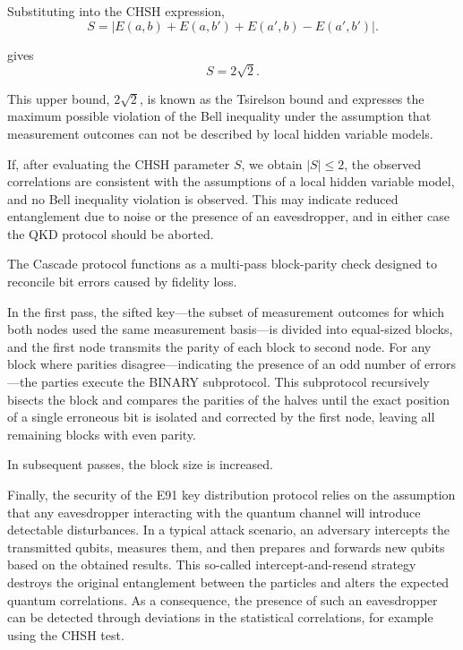 \noindent Substituting into the CHSH expression,
\[
S = \left|E(a, b) + E(a, b') + E(a', b) - E(a', b')\right|.
\]

gives
\[
S =  2\sqrt{2}.
\]

This upper bound, $2\sqrt{2}$, is known as the Tsirelson bound and expresses the maximum possible violation of the Bell inequality under the assumption that measurement outcomes can not be described by local hidden variable models.

If, after evaluating the CHSH parameter $S$, we obtain $|S| \leq 2$, the observed correlations are consistent with the assumptions of a local hidden variable model, and no Bell inequality violation is observed. This may indicate reduced entanglement due to noise or the presence of an eavesdropper, and in either case the QKD protocol should be aborted.

The Cascade protocol functions as a multi-pass block-parity check designed to reconcile bit errors caused by fidelity loss.

In the first pass, the sifted key—the subset of measurement outcomes for which both nodes used the same measurement basis—is divided into equal-sized blocks, and the first node transmits the parity of each block to second node. For any block where parities disagree—indicating the presence of an odd number of errors—the parties execute the BINARY subprotocol. This subprotocol recursively bisects the block and compares the parities of the halves until the exact position of a single erroneous bit is isolated and corrected by the first node, leaving all remaining blocks with even parity.

In subsequent passes, the block size is increased. 

Finally, the security of the E91 key distribution protocol relies on the assumption that any eavesdropper interacting with the quantum channel will introduce detectable disturbances. In a typical attack scenario, an adversary intercepts the transmitted qubits, measures them, and then prepares and forwards new qubits based on the obtained results. This so-called intercept-and-resend strategy destroys the original entanglement between the particles and alters the expected quantum correlations. As a consequence, the presence of such an eavesdropper can be detected through deviations in the statistical correlations, for example using the CHSH test.
